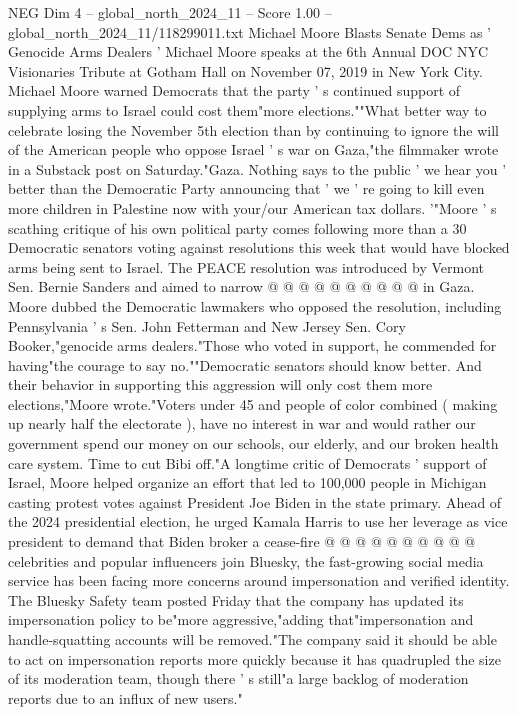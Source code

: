 \begin{textsample}{NEG Dim 4 – global\_north\_2024\_11 – Score 1.00 – global\_north\_2024\_11/118299011.txt}  \label{ex:f4_neg_169}
Michael Moore Blasts Senate Dems as ' Genocide Arms Dealers ' Michael Moore speaks at the 6th Annual DOC NYC Visionaries Tribute at Gotham Hall on November 07, 2019 in New York City.
Michael Moore warned Democrats that the party ' s continued support of supplying arms to Israel could cost them"more elections.""What better way to celebrate losing the November 5th election than by continuing to ignore the will of the American people who oppose Israel ' s war on Gaza,"the filmmaker wrote in a Substack post on Saturday."Gaza.
Nothing says to the public ' we hear you ' better than the Democratic Party announcing that ' we ' re going to kill even more children in Palestine now with your/our American tax dollars. '"Moore ' s scathing critique of his own political party comes following more than a 30 Democratic senators voting against resolutions this week that would have blocked arms being sent to Israel.
The PEACE resolution was introduced by Vermont Sen.
Bernie Sanders and aimed to narrow @ @ @ @ @ @ @ @ @ @ in Gaza.
Moore dubbed the Democratic lawmakers who opposed the resolution, including Pennsylvania ' s Sen.
John Fetterman and New Jersey Sen.
Cory Booker,"genocide arms dealers."Those who voted in support, he commended for having"the courage to say no.""Democratic senators should know better.
And their behavior in supporting this aggression will only cost them more elections,"Moore wrote."Voters under 45 and people of color combined ( making up nearly half the electorate ), have no interest in war and would rather our government spend our money on our schools, our elderly, and our broken health care system.
Time to cut Bibi off."A longtime critic of Democrats ' support of Israel, Moore helped organize an effort that led to 100,000 people in Michigan casting protest votes against President Joe Biden in the state primary.
Ahead of the 2024 presidential election, he urged Kamala Harris to use her leverage as vice president to demand that Biden broker a cease-fire @ @ @ @ @ @ @ @ @ @ celebrities and popular influencers join Bluesky, the fast-growing social media service has been facing more concerns around impersonation and verified identity.
The Bluesky Safety team posted Friday that the company has updated its impersonation policy to be"more aggressive,"adding that"impersonation and handle-squatting accounts will be removed."The company said it should be able to act on impersonation reports more quickly because it has quadrupled the size of its moderation team, though there ' s still"a large backlog of moderation reports due to an influx of new users."

\end{textsample}
